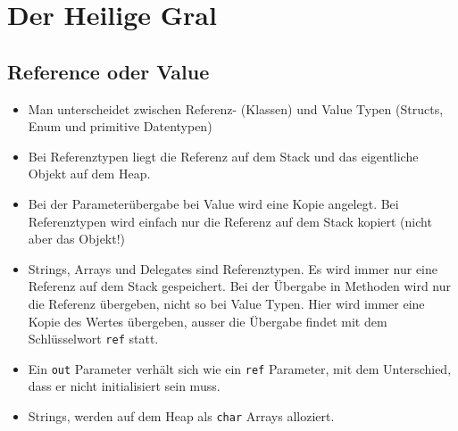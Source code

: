 


\newcommand{\SUBJECT}{Zusammenfassung}
\newcommand{\TITLE}{Microsoft Technologien}




\lstset{style=visual-studio-style}

\section{Der Heilige Gral}
\subsection{Reference oder Value}
\begin{itemize}
	\item Man unterscheidet zwischen Referenz- (Klassen) und Value Typen (Structs, Enum und primitive Datentypen)
	\item Bei Referenztypen liegt die Referenz auf dem Stack und das eigentliche Objekt auf dem Heap.
	\item Bei der Parameterübergabe bei Value wird eine Kopie angelegt. Bei Referenztypen wird einfach nur die Referenz auf dem Stack kopiert (nicht aber das Objekt!)
		\item Strings, Arrays und Delegates sind Referenztypen. Es wird immer nur eine Referenz auf dem Stack gespeichert. Bei der Übergabe in Methoden wird nur die Referenz übergeben, nicht so bei Value Typen. Hier wird immer eine Kopie des Wertes übergeben, ausser die Übergabe findet mit dem Schlüsselwort \lstinline|ref| statt.
	\item Ein \lstinline|out| Parameter verhält sich wie ein \lstinline|ref| Parameter, mit dem Unterschied, dass er nicht initialisiert sein muss.
	\item Strings, werden auf dem Heap als \lstinline|char| Arrays alloziert.

\end{itemize}

